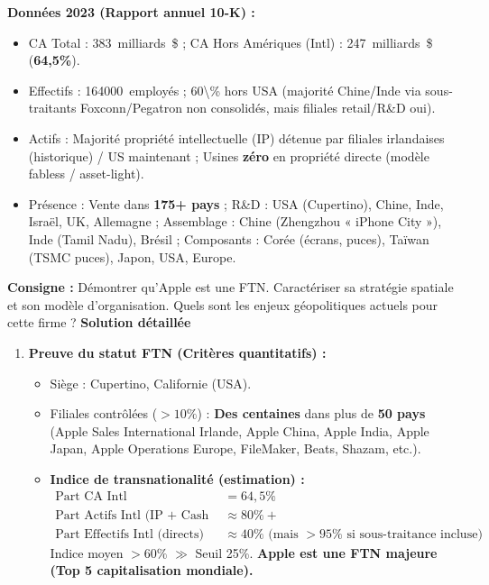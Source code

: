 \documentclass[11pt]{article}
\newcommand{\cle}[1]{{\popxbold\color{popdark}#1}}
\begin{document}
\begin{exoresolu}
    \textbf{Données 2023 (Rapport annuel 10-K) :}
    \begin{itemize}
        \item CA Total : \SI{383}{milliards \$} ; CA Hors Amériques (Intl) : \SI{247}{milliards \$} (\textbf{64,5\%}).
        \item Effectifs : \SI{164 000}{employés} ; \num{60\%} hors USA (majorité Chine/Inde via sous-traitants Foxconn/Pegatron non consolidés, mais filiales retail/R\&D oui).
        \item Actifs : Majorité propriété intellectuelle (IP) détenue par filiales irlandaises (historique) / US maintenant ; Usines \textbf{zéro} en propriété directe (modèle \cle{fabless} / \cle{asset-light}).
        \item Présence : Vente dans \textbf{175+ pays} ; R\&D : USA (Cupertino), Chine, Inde, Israël, UK, Allemagne ; Assemblage : Chine (Zhengzhou « iPhone City »), Inde (Tamil Nadu), Brésil ; Composants : Corée (écrans, puces), Taïwan (TSMC puces), Japon, USA, Europe.
    \end{itemize}
    \textbf{Consigne :} Démontrer qu'Apple est une FTN. Caractériser sa stratégie spatiale et son modèle d'organisation. Quels sont les enjeux géopolitiques actuels pour cette firme ?
    \tcblower
    \textbf{Solution détaillée}
    \begin{enumerate}
        \item \textbf{Preuve du statut FTN (Critères quantitatifs) :}
            \begin{itemize}
                \item Siège : Cupertino, Californie (USA).
                \item Filiales contrôlées ($>10\%$) : \textbf{Des centaines} dans plus de \textbf{50 pays} (Apple Sales International Irlande, Apple China, Apple India, Apple Japan, Apple Operations Europe, FileMaker, Beats, Shazam, etc.).
                \item \textbf{Indice de transnationalité (estimation) :}
                    \begin{align*}
                        \text{Part CA Intl} &= 64,5\% \\
                        \text{Part Actifs Intl (IP + Cash offshore)} &\approx 80\%+ \\
                        \text{Part Effectifs Intl (directs)} &\approx 40\% \text{ (mais } >95\% \text{ si sous-traitance incluse)}
                    \end{align*}
                    Indice moyen $> 60\%$ $\gg$ Seuil 25\%. \textbf{Apple est une FTN majeure (Top 5 capitalisation mondiale).}
            \end{itemize}
        

\end{enumerate}
\end{exoresolu}
\end{document}
